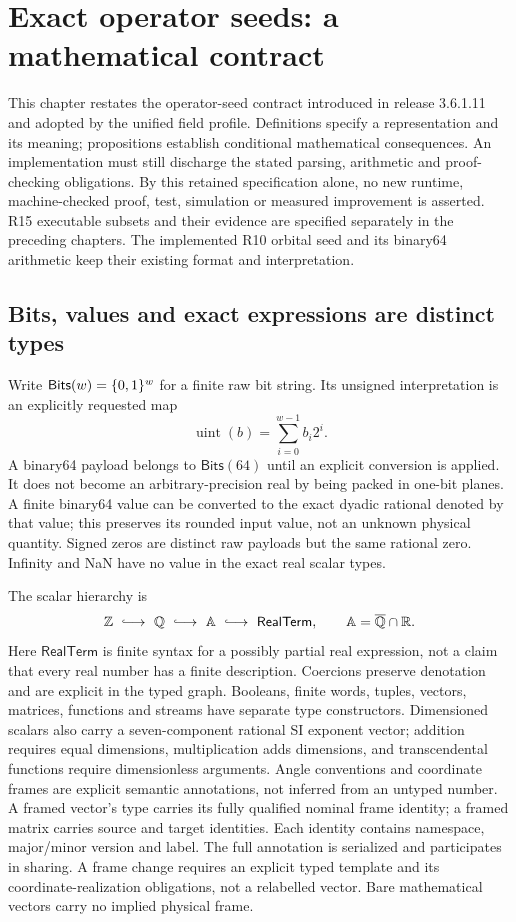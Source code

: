 \section{Exact operator seeds: a mathematical contract}
\label{sec:exact-core}
This chapter restates the  operator-seed contract introduced in
release 3.6.1.11 and adopted by the unified field profile. Definitions specify
a representation and its meaning;
propositions establish conditional mathematical consequences. An implementation
must still discharge the stated parsing, arithmetic and proof-checking
obligations. By this retained specification alone, no new runtime, machine-checked
proof, test, simulation or measured improvement is asserted. R15 executable
subsets and their evidence are specified separately in the preceding chapters. The implemented R10 orbital seed and its binary64
arithmetic keep their existing format and interpretation.

\subsection{Bits, values and exact expressions are distinct types}
Write $\mathsf{Bits}(w)=\{0,1\}^w$ for a finite raw bit string. Its unsigned
interpretation is an explicitly requested map
\[
 \operatorname{uint}(b)=\sum_{i=0}^{w-1}b_i2^i.
\]
A binary64 payload belongs to $\mathsf{Bits}(64)$ until an explicit conversion
is applied. It does not become an arbitrary-precision real by being packed in
one-bit planes. A finite binary64 value can be converted to the exact dyadic
rational denoted by that value; this preserves its rounded input value, not an
unknown physical quantity. Signed zeros are distinct raw payloads but the same
rational zero. Infinity and NaN have no value in the exact real scalar types.

The scalar hierarchy is
\[
 \Z\ \lhook\joinrel\longrightarrow\ \mathbb Q
 \ \lhook\joinrel\longrightarrow\ \mathbb A
 \ \lhook\joinrel\longrightarrow\ \mathsf{RealTerm},
 \qquad \mathbb A=\overline{\mathbb Q}\cap\R.
\]
Here $\mathsf{RealTerm}$ is finite syntax for a possibly partial real expression,
not a claim that every real number has a finite description. Coercions preserve
denotation and are explicit in the typed graph. Booleans, finite words, tuples,
vectors, matrices, functions and streams have separate type constructors.
Dimensioned scalars also carry a seven-component rational SI exponent vector;
addition requires equal dimensions, multiplication adds dimensions, and
transcendental functions require dimensionless arguments. Angle conventions and
coordinate frames are explicit semantic annotations, not inferred from an
untyped number. A framed vector's type carries its fully qualified nominal frame
identity; a framed matrix carries source and target identities. Each identity
contains namespace, major/minor version and label. The full annotation is
serialized and participates in sharing. A frame change requires an explicit
typed template and its coordinate-realization obligations, not a relabelled
vector. Bare mathematical vectors carry no implied physical frame.

